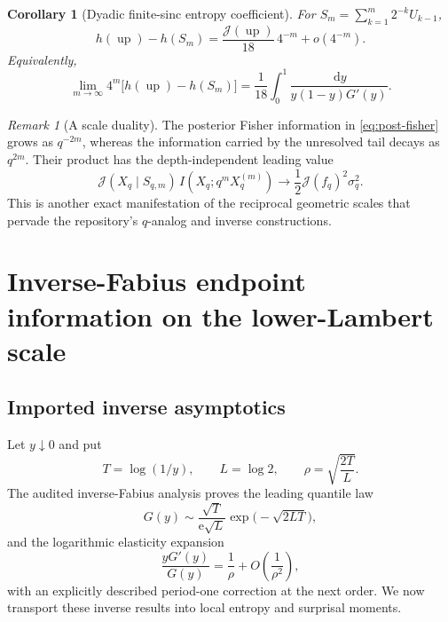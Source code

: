 \documentclass[11pt,oneside]{article}
\newtheorem{corollary}[theorem]{Corollary}
\theoremstyle{definition}
\theoremstyle{remark}
\newtheorem{remark}[theorem]{Remark}
\newcommand{\Up}{\operatorname{up}}
\newcommand{\dd}{\,\mathrm d}
\newcommand{\e}{\mathrm e}
\begin{document}
\begin{corollary}[Dyadic finite-sinc entropy coefficient]
\label{cor:dyadic-fisher-gap}
For $S_m=\sum_{k=1}^m2^{-k}U_{k-1}$,
\begin{equation}
 h(\Up)-h(S_m)
 =\frac{\mathcal J(\Up)}{18}\,4^{-m}+o(4^{-m}).
 \label{eq:dyadic-fisher-gap}
\end{equation}
Equivalently,
\begin{equation}
 \lim_{m\to\infty}4^m\bigl[h(\Up)-h(S_m)\bigr]
 =\frac1{18}\int_0^1\frac{\dd y}{y(1-y)G'(y)}.
 \label{eq:dyadic-fisher-G-limit}
\end{equation}
\end{corollary}

\begin{remark}[A scale duality]
The posterior Fisher information in \eqref{eq:post-fisher} grows as $q^{-2m}$,
whereas the information carried by the unresolved tail decays as $q^{2m}$.  Their
product has the depth-independent leading value
\begin{equation}
 \mathcal J(X_q\mid S_{q,m})\,
 I(X_q;q^mX_q^{(m)})
 \longrightarrow\frac12\mathcal J(f_q)^2\sigma_q^2.
 \label{eq:fisher-tail-duality}
\end{equation}
This is another exact manifestation of the reciprocal geometric scales that
pervade the repository's $q$-analog and inverse constructions.
\end{remark}

\section{Inverse-Fabius endpoint information on the lower-Lambert scale}
\label{sec:Lambert-entropy}

\subsection{Imported inverse asymptotics}

Let $y\downarrow0$ and put
\begin{equation}
 T=\log(1/y),
 \qquad L=\log2,
 \qquad \rho=\sqrt{\frac{2T}{L}}.
 \label{eq:T-rho}
\end{equation}
The audited inverse-Fabius analysis proves the leading quantile law
\begin{equation}
 G(y)
 \sim\frac{\sqrt T}{\e\sqrt L}
       \exp\!\bigl(-\sqrt{2LT}\bigr),
 \label{eq:G-leading}
\end{equation}
and the logarithmic elasticity expansion
\begin{equation}
 \frac{yG'(y)}{G(y)}
 =\frac1\rho+O\!\left(\frac1{\rho^2}\right),
 \label{eq:elasticity-leading}
\end{equation}
with an explicitly described period-one correction at the next order.  We now
transport these inverse results into local entropy and surprisal moments.
\end{document}
